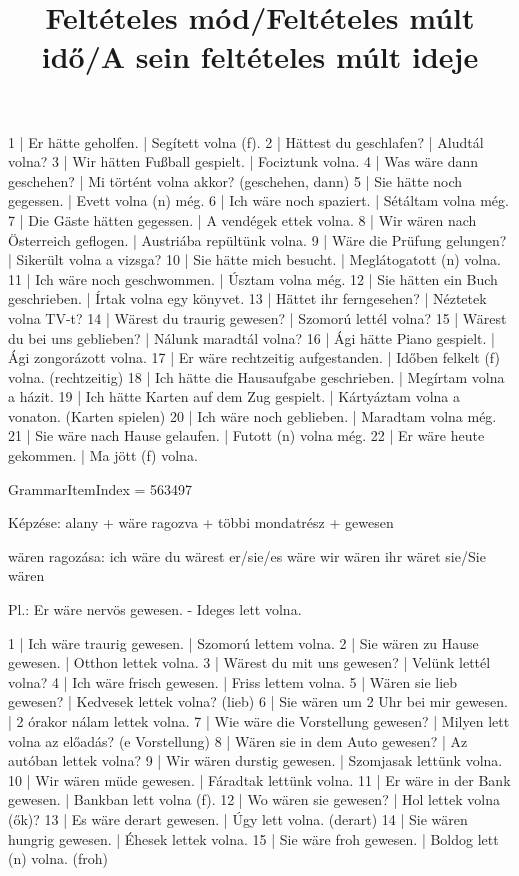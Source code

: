 \begin{exmp}
1 | Er hätte geholfen. | Segített volna (f).
2 | Hättest du geschlafen? | Aludtál volna?
3 | Wir hätten Fußball gespielt. | Fociztunk volna.
4 | Was wäre dann geschehen? | Mi történt volna akkor? (geschehen, dann)
5 | Sie hätte noch gegessen. | Evett volna (n) még.
6 | Ich wäre noch spaziert. | Sétáltam volna még.
7 | Die Gäste hätten gegessen. | A vendégek ettek volna.
8 | Wir wären nach Österreich geflogen. | Austriába repültünk volna.
9 | Wäre die Prüfung gelungen? | Sikerült volna a vizsga?
10 | Sie hätte mich besucht. | Meglátogatott (n) volna.
11 | Ich wäre noch geschwommen. | Úsztam volna még.
12 | Sie hätten ein Buch geschrieben. | Írtak volna egy könyvet.
13 | Hättet ihr ferngesehen? | Néztetek volna TV-t?
14 | Wärest du traurig gewesen? | Szomorú lettél volna?
15 | Wärest du bei uns geblieben? | Nálunk maradtál volna?
16 | Ági hätte Piano gespielt. | Ági zongorázott volna.
17 | Er wäre rechtzeitig aufgestanden. | Időben felkelt (f) volna. (rechtzeitig)
18 | Ich hätte die Hausaufgabe geschrieben. | Megírtam volna a házit.
19 | Ich hätte Karten auf dem Zug gespielt. | Kártyáztam volna a vonaton. (Karten spielen)
20 | Ich wäre noch geblieben. | Maradtam volna még.
21 | Sie wäre nach Hause gelaufen. | Futott (n) volna még.
22 | Er wäre heute gekommen. | Ma jött (f) volna.
\end{exmp}

\title{Feltételes mód/Feltételes múlt idő/A sein feltételes múlt ideje}

GrammarItemIndex = 563497

\begin{desc}
Képzése:
alany + wäre ragozva + többi mondatrész + gewesen

wären ragozása:
ich wäre
du wärest
er/sie/es wäre
wir wären
ihr wäret
sie/Sie wären

Pl.: Er wäre nervös gewesen. - Ideges lett volna.
\end{desc}

\begin{exmp}
1 | Ich wäre traurig gewesen. | Szomorú lettem volna.
2 | Sie wären zu Hause gewesen. | Otthon lettek volna.
3 | Wärest du mit uns gewesen? | Velünk lettél volna?
4 | Ich wäre frisch gewesen. | Friss lettem volna.
5 | Wären sie lieb gewesen? | Kedvesek lettek volna? (lieb)
6 | Sie wären um 2 Uhr bei mir gewesen. | 2 órakor nálam lettek volna.
7 | Wie wäre die Vorstellung gewesen? | Milyen lett volna az előadás? (e Vorstellung)
8 | Wären sie in dem Auto gewesen? | Az autóban lettek volna?
9 | Wir wären durstig gewesen. | Szomjasak lettünk volna.
10 | Wir wären müde gewesen. | Fáradtak lettünk volna.
11 | Er wäre in der Bank gewesen. | Bankban lett volna (f).
12 | Wo wären sie gewesen? | Hol lettek volna (ők)?
13 | Es wäre derart gewesen. | Úgy lett volna. (derart)
14 | Sie wären hungrig gewesen. | Éhesek lettek volna.
15 | Sie wäre froh gewesen. | Boldog lett (n) volna. (froh)
\end{exmp}


